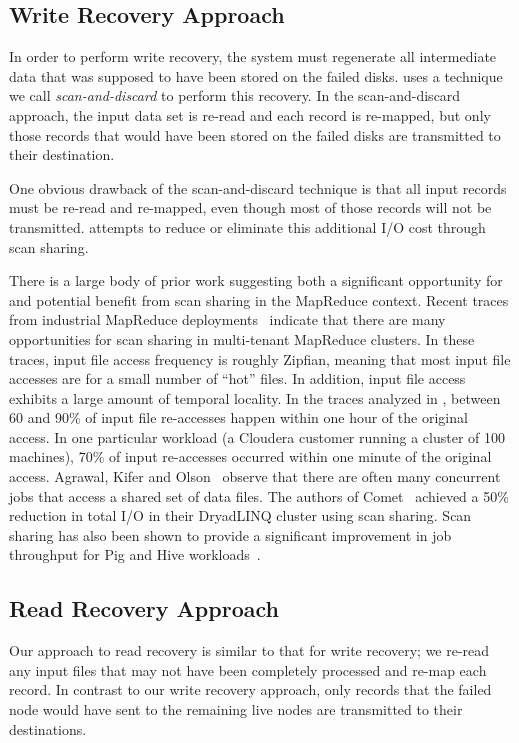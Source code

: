 \subsection{Write Recovery Approach}

In order to perform write recovery, the system must regenerate all intermediate
data that was supposed to have been stored on the failed disks. \themis uses a
technique we call \emph{scan-and-discard} to perform this recovery. In the
scan-and-discard approach, the input data set is re-read and each record is
re-mapped, but only those records that would have been stored on the failed
disks are transmitted to their destination.

One obvious drawback of the scan-and-discard technique is that all input
records must be re-read and re-mapped, even though most of those records will
not be transmitted. \themis attempts to reduce or eliminate this additional I/O
cost through scan sharing.

There is a large body of prior work suggesting both a significant opportunity
for and potential benefit from scan sharing in the MapReduce context. Recent
traces from industrial MapReduce deployments~\cite{Chen2012} indicate that
there are many opportunities for scan sharing in multi-tenant MapReduce
clusters. In these traces, input file access frequency is roughly Zipfian,
meaning that most input file accesses are for a small number of ``hot''
files. In addition, input file access exhibits a large amount of temporal
locality. In the traces analyzed in \cite{Chen2012}, between 60 and 90\% of
input file re-accesses happen within one hour of the original access. In one
particular workload (a Cloudera customer running a cluster of 100 machines),
70\% of input re-accesses occurred within one minute of the original access.
Agrawal, Kifer and Olson~\cite{ako08} observe that there are often many
concurrent jobs that access a shared set of data files. The authors of
Comet~\cite{comet} achieved a 50\% reduction in total I/O in their DryadLINQ
cluster using scan sharing. Scan sharing has also been shown to provide a
significant improvement in job throughput for Pig and Hive
workloads~\cite{nova, coscan, query-opt-mapreduce}.

\subsection{Read Recovery Approach}

Our approach to read recovery is similar to that for write recovery; we re-read
any input files that may not have been completely processed and re-map each
record. In contrast to our write recovery approach, only records that the
failed node would have sent to the remaining live nodes are transmitted to
their destinations.

